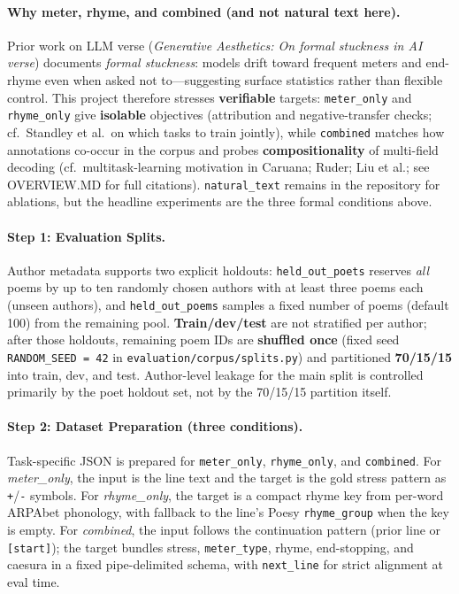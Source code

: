 \paragraph{Why meter, rhyme, and combined (and not natural text here).}
Prior work on LLM verse (\emph{Generative Aesthetics: On formal stuckness in AI verse}) documents \emph{formal stuckness}: models drift toward frequent meters and end-rhyme even when asked not to---suggesting surface statistics rather than flexible control.
This project therefore stresses \textbf{verifiable} targets: \texttt{meter\_only} and \texttt{rhyme\_only} give \textbf{isolable} objectives (attribution and negative-transfer checks; cf.\ Standley et al.\ on which tasks to train jointly), while \texttt{combined} matches how annotations co-occur in the corpus and probes \textbf{compositionality} of multi-field decoding (cf.\ multitask-learning motivation in Caruana; Ruder; Liu et al.; see OVERVIEW.MD for full citations).
\texttt{natural\_text} remains in the repository for ablations, but the headline experiments are the three formal conditions above.

\paragraph{Step 1: Evaluation Splits.}
Author metadata supports two explicit holdouts: \texttt{held\_out\_poets} reserves \emph{all} poems by up to ten randomly chosen authors with at least three poems each (unseen authors), and \texttt{held\_out\_poems} samples a fixed number of poems (default 100) from the remaining pool.
\textbf{Train/dev/test} are not stratified per author; after those holdouts, remaining poem IDs are \textbf{shuffled once} (fixed seed \texttt{RANDOM\_SEED = 42} in \texttt{evaluation/corpus/splits.py}) and partitioned \textbf{70/15/15} into train, dev, and test.
Author-level leakage for the main split is controlled primarily by the poet holdout set, not by the 70/15/15 partition itself.

\paragraph{Step 2: Dataset Preparation (three conditions).}
Task-specific JSON is prepared for \texttt{meter\_only}, \texttt{rhyme\_only}, and \texttt{combined}.
For \textit{meter\_only}, the input is the line text and the target is the gold stress pattern as \texttt{+}/\texttt{-} symbols.
For \textit{rhyme\_only}, the target is a compact rhyme key from per-word ARPAbet phonology, with fallback to the line's Poesy \texttt{rhyme\_group} when the key is empty.
For \textit{combined}, the input follows the continuation pattern (prior line or \texttt{[start]}); the target bundles stress, \texttt{meter\_type}, rhyme, end-stopping, and caesura in a fixed pipe-delimited schema, with \texttt{next\_line} for strict alignment at eval time.

